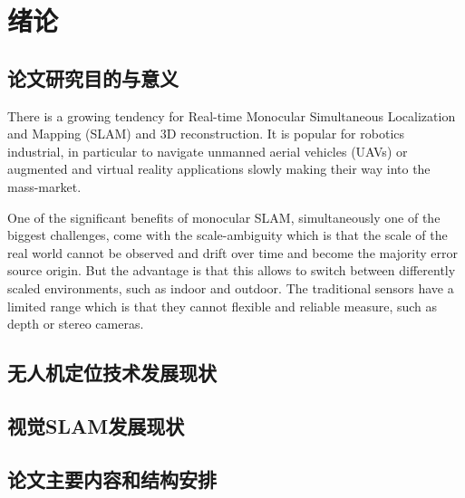 
\chapter{绪论}
\label{chap:intro}

\section{论文研究目的与意义}

There is a growing tendency for Real-time Monocular Simultaneous Localization and Mapping (SLAM) and 3D reconstruction. It is popular for robotics industrial, in particular to navigate unmanned aerial vehicles (UAVs) or augmented and virtual reality applications slowly making their way into the mass-market.

One of the significant benefits of monocular SLAM, simultaneously one of the biggest challenges, come with the scale-ambiguity which is that the scale of the real world cannot be observed and drift over time and become the majority error source origin. But the advantage is that this allows to switch between differently scaled environments, such as indoor and outdoor. The traditional sensors have a limited range which is that they cannot flexible and reliable measure, such as depth or stereo cameras.


\section{无人机定位技术发展现状}


\section{视觉SLAM发展现状}



\section{论文主要内容和结构安排}




